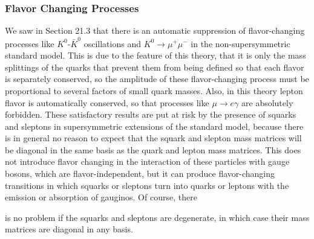 \subsubsection*{Flavor Changing Processes}

We saw in Section 21.3 that there is an automatic suppression of
flavor-changing processes like \(K^0\)-\(\bar K^0\) oscillations and
\(K^0\longrightarrow\mu^+\mu^-\) in the non-supersymmetric standard
model. This is due to the feature of this theory, that it is only the mass
splittings of the quarks that prevent them from being defined so that each
flavor is separately conserved, so the amplitude of these flavor-changing
process must be proportional to several factors of small quark masses.
Also, in this theory lepton flavor is automatically conserved, so that
processes like \(\mu\longrightarrow e\gamma\) are absolutely forbidden.
These satisfactory results are put at risk by the presence of squarks and
sleptons in supersymmetric extensions of the standard model, because there
is in general no reason to expect that the squark and slepton mass matrices
will be diagonal in the same basis as the quark and lepton mass matrices.
This does not introduce flavor changing in the interaction of these
particles with gauge bosons, which are flavor-independent, but it can
produce flavor-changing transitions in which squarks or sleptons turn into
quarks or leptons with the emission or absorption of gauginos. Of course,
there


\noindent
is no problem if the squarks and sleptons are degenerate, in which case
their mass matrices are diagonal in any basis.

